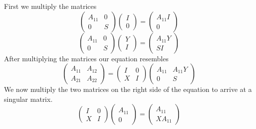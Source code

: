 \documentclass{article}
\begin{document}
First we multiply the matrices 
\begin{equation}
\begin{pmatrix}
A_{11} & 0 \\
0 & S 
\end{pmatrix}
\begin{pmatrix}
I \\
0
\end{pmatrix}
=
\begin{pmatrix}
A_{11}I\\
0
\end{pmatrix}
\end{equation}
\begin{equation}
\begin{pmatrix}
A_{11} & 0 \\
0 & S 
\end{pmatrix}
\begin{pmatrix}
Y \\
I
\end{pmatrix}
=
\begin{pmatrix}
A_{11}Y\\
SI
\end{pmatrix}
\end{equation}
After multiplying the matrices our equation resembles
\begin{equation}
\begin{pmatrix}
A_{11} & A_{12} \\
A_{21} & A_{22} 
\end{pmatrix}
=
\begin{pmatrix}
I & 0 \\
X & I 
\end{pmatrix}
\begin{pmatrix}
A_{11} & A_{11}Y \\
0 & S
\end{pmatrix}
\end{equation}
We now multiply the two matrices on the right side of the equation to arrive at a singular matrix. 
\begin{equation}
\begin{pmatrix}
I & 0 \\
X & I 
\end{pmatrix}
\begin{pmatrix}
A_{11}\\
0
\end{pmatrix}
=
\begin{pmatrix}
A_{11} \\
XA_{11}
\end{pmatrix}
\end{equation}
\end{document}
